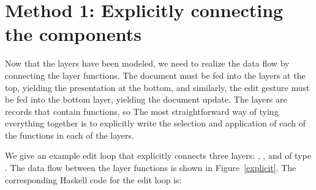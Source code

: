 \documentclass[preprint,natbib]{sigplanconf}
\begin{document}
%																
%																
%																
\section{Method 1: Explicitly connecting the components} \label{sect:simple}

Now that the layers have been modeled, we need to realize the data flow by connecting the layer functions. The document must be fed into the layers at the top, yielding the presentation at the bottom, and similarly, the edit gesture must be fed into the bottom layer, yielding the document update. \bc The layers are records that contain functions, so  \ec The most straightforward way of tying everything together is to explicitly write the selection and application of each of the functions in each of the layers. 

We give an example edit loop that explicitly connects three layers: , , and  of type . The data flow between the layer functions is shown in Figure~\ref{explicit}. The corresponding Haskell code for the edit loop is:
\end{document}
